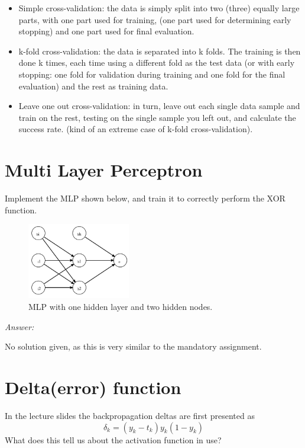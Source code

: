 \begin{itemize}
    \item Simple cross-validation: the data is simply split into two (three) equally large parts, with one part used for training, (one part used for determining early stopping) and one part used for final evaluation.
    \item k-fold cross-validation: the data is separated into k folds. The training is then done k times, each time using a different fold as the test data (or with early stopping: one fold for validation during training and one fold for the final evaluation) and the rest as training data.
    \item Leave one out cross-validation: in turn, leave out each single data sample and train on the rest, testing on the single sample you left out, and calculate the success rate. (kind of an extreme case of k-fold cross-validation).
\end{itemize}

\section{Multi Layer Perceptron}
Implement the MLP shown below, and train it to correctly perform the XOR function.

\begin{figure}[H]
\begin{center}
\includegraphics[width=0.4\textwidth]{mlp.png}
\caption{MLP with one hidden layer and two hidden nodes.}
\label{fig:mlp}
\end{center}
\end{figure}

\noindent\textit{Answer:}

\noindent
No solution given, as this is very similar to the mandatory assignment.

\section{Delta(error) function}
In the lecture slides the backpropagation deltas are first presented as
\[
\delta_k = (y_k - t_k)y_k(1-y_k)
\]
What does this tell us about the activation function in use?\\

